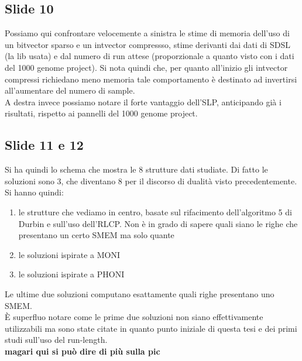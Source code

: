 \documentclass[a4paper,11pt, oneside,italian]{article}
\begin{document}
\subsection*{Slide 10}
Possiamo qui confrontare velocemente a sinistra le stime di memoria dell'uso di
un bitvector sparso e un intvector compressso, stime derivanti dai dati di SDSL
(la lib usata) e dal numero di run attese (proporzionale a quanto visto con i
dati del 1000 genome project). Si nota quindi che, per quanto all'inizio gli
intvector compressi richiedano meno memoria tale comportamento è destinato ad
invertirsi all'aumentare del numero di sample.\\
A destra invece possiamo notare il forte vantaggio dell'SLP, anticipando già i
risultati, rispetto ai pannelli del 1000 genome project.
\subsection*{Slide 11 e 12}
Si ha quindi lo schema che mostra le 8 strutture dati studiate. Di fatto le
soluzioni sono 3, che diventano 8 per il discorso di dualità visto
precedentemente.
Si hanno quindi:
\begin{enumerate}
  \item le strutture che vediamo in centro, basate sul rifacimento
  dell'algoritmo 5 di Durbin e sull'uso dell'RLCP. Non è in grado di sapere
  quali siano le righe che presentano un certo SMEM ma solo quante
  \item le soluzioni ispirate a MONI
  \item le soluzioni ispirate a PHONI
\end{enumerate}
Le ultime due soluzioni computano esattamente quali righe presentano uno SMEM.\\
È superfluo notare come le prime due soluzioni non siano effettivamente
utilizzabili ma sono state citate in quanto punto iniziale di questa tesi e dei
primi studi sull'uso del run-length.\\
\textbf{magari qui si può dire di più sulla pic}
\end{document}
